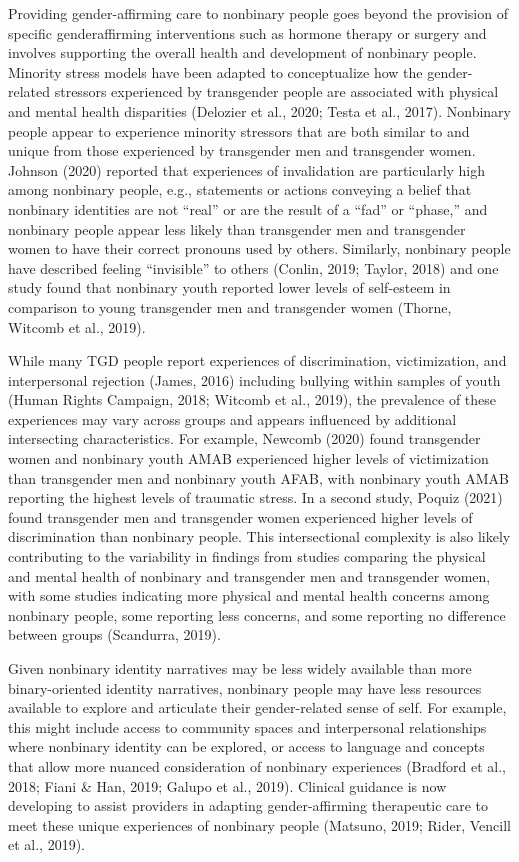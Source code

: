 \documentclass[
]{book}
\begin{document}
Providing gender-affirming care to nonbinary people goes beyond the provision of specific genderaffirming interventions such as hormone therapy
or surgery and involves supporting the overall
health and development of nonbinary people.
Minority stress models have been adapted to conceptualize how the gender-related stressors experienced by transgender people are associated with
physical and mental health disparities (Delozier
et al., 2020; Testa et al., 2017). Nonbinary people
appear to experience minority stressors that are
both similar to and unique from those experienced
by transgender men and transgender women.
Johnson (2020) reported that experiences of invalidation are particularly high among nonbinary
people, e.g., statements or actions conveying a
belief that nonbinary identities are not ``real'' or
are the result of a ``fad'' or ``phase,'' and nonbinary
people appear less likely than transgender men
and transgender women to have their correct pronouns used by others. Similarly, nonbinary people
have described feeling ``invisible'' to others (Conlin,
2019; Taylor, 2018) and one study found that nonbinary youth reported lower levels of self-esteem
in comparison to young transgender men and
transgender women (Thorne, Witcomb et al., 2019).

While many TGD people report experiences
of discrimination, victimization, and interpersonal
rejection (James, 2016) including bullying within
samples of youth (Human Rights Campaign,
2018; Witcomb et al., 2019), the prevalence of
these experiences may vary across groups and
appears influenced by additional intersecting
characteristics. For example, Newcomb (2020)
found transgender women and nonbinary youth
AMAB experienced higher levels of victimization
than transgender men and nonbinary youth
AFAB, with nonbinary youth AMAB reporting
the highest levels of traumatic stress. In a second
study, Poquiz (2021) found transgender men and
transgender women experienced higher levels of
discrimination than nonbinary people. This intersectional complexity is also likely contributing to
the variability in findings from studies comparing
the physical and mental health of nonbinary and
transgender men and transgender women, with
some studies indicating more physical and mental
health concerns among nonbinary people, some
reporting less concerns, and some reporting no
difference between groups (Scandurra, 2019).

Given nonbinary identity narratives may be less
widely available than more binary-oriented identity narratives, nonbinary people may have less
resources available to explore and articulate their
gender-related sense of self. For example, this
might include access to community spaces and
interpersonal relationships where nonbinary identity can be explored, or access to language and
concepts that allow more nuanced consideration
of nonbinary experiences (Bradford et al., 2018;
Fiani \& Han, 2019; Galupo et al., 2019). Clinical
guidance is now developing to assist providers in
adapting gender-affirming therapeutic care to
meet these unique experiences of nonbinary people (Matsuno, 2019; Rider, Vencill et al., 2019).
\end{document}
